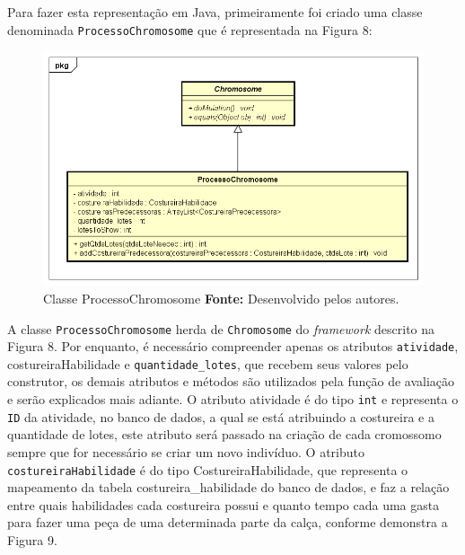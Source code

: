\par Para fazer esta representação em Java, primeiramente foi criado uma classe denominada \texttt{ProcessoChromosome} que é
representada na Figura 8:

\begin{figure}[h!]
	\centerline{\includegraphics[scale=0.5]{./imagens/processo_chromosome_diagram.png}}
	\caption[Classe ProcessoChromosome]
	{Classe ProcessoChromosome \textbf{Fonte:} Desenvolvido pelos autores.}
	\label{fig:exemplo1}
\end{figure}


\par A classe \texttt{ProcessoChromosome} herda de \texttt{Chromosome} do
\textit{framework} descrito na Figura 8. Por enquanto, é necessário compreender
apenas os atributos \texttt{atividade}, costureiraHabilidade e
\texttt{quantidade\_lotes}, que recebem seus valores pelo construtor, os
demais atributos e métodos são utilizados pela função de avaliação e serão explicados mais adiante. 
O atributo atividade é do tipo \texttt{int} e representa o \texttt{ID} da
atividade, no banco de dados, a qual se está atribuindo a costureira e a
quantidade de lotes, este atributo será passado na criação de cada cromossomo
sempre que for necessário se criar um novo indivíduo. O atributo \texttt{costureiraHabilidade} é do tipo CostureiraHabilidade, que representa o
mapeamento da tabela costureira\_habilidade do banco de dados, e faz a relação
entre quais habilidades cada costureira possui e quanto tempo cada uma gasta para fazer uma peça de 
uma determinada parte da calça, conforme demonstra a Figura 9.


